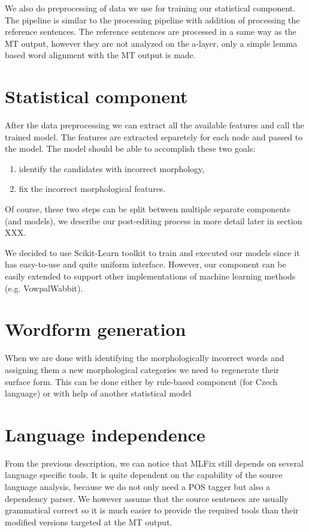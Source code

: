 We also do preprocessing of data we use for training our statistical component.
The pipeline is similar to the processing pipeline with addition of processing
the reference sentences. The reference sentences are processed in a same way
as the MT output, however they are not analyzed on the a-layer, only a simple
lemma based word alignment with the MT output is made.

\section{Statistical component}

After the data preprocessing we can extract all the available features and
call the trained model. The features are extracted separetely for each node and passed
to the model. The model should be able to accomplish these two goals:
\begin{enumerate}
    \item identify the candidates with incorrect morphology,
    \item fix the incorrect morphological features.
\end{enumerate}
Of course, these two steps can be split between multiple separate components (and models),
we describe our post-editing process in more detail later in section XXX.

We decided to use Scikit-Learn toolkit to train and executed our models since
it has easy-to-use and quite uniform interface. However, our component can be easily
extended to support other implementations of machine learning methods (e.g. VowpalWabbit).

\section{Wordform generation}

When we are done with identifying the morphologically incorrect words and assigning
them a new morphological categories we need to regenerate their surface form.
This can be done either by rule-based component (for Czech language) or with
help of another statistical model

\section{Language independence}

From the previous description, we can notice that MLFix still depends on several
language specific tools. It is quite dependent on the capability of the source
language analysis, because we do not only need a POS tagger but also a dependency
parser. We however assume that the source sentences are usually grammatical correct
so it is much easier to provide the required tools than their modified versions
targeted at the MT output.


